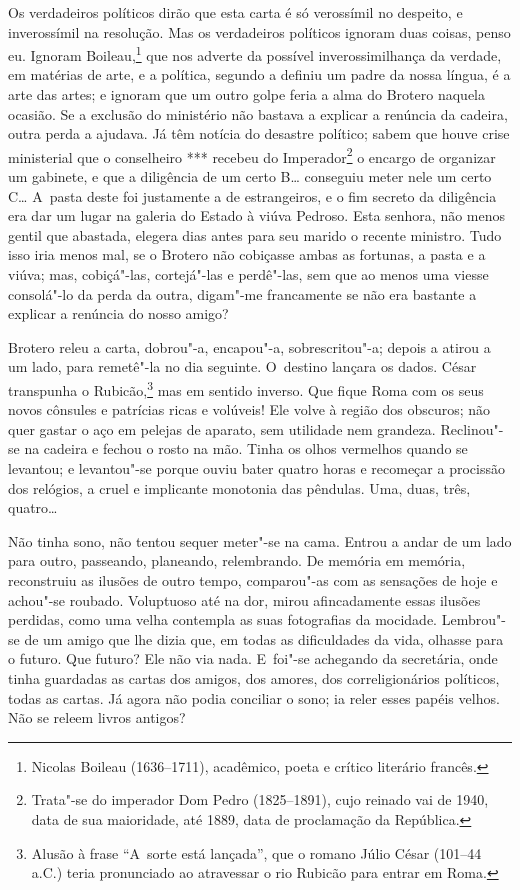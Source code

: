 \begin{linenumbers}
Os verdadeiros políticos dirão que esta carta é só verossímil no
despeito, e inverossímil na resolução. Mas os verdadeiros políticos
ignoram duas coisas, penso eu. Ignoram Boileau,\footnote{Nicolas Boileau
  (1636--1711), acadêmico, poeta e crítico literário francês.} que nos
adverte da possível inverossimilhança da verdade, em matérias de arte, e
a política, segundo a definiu um padre da nossa língua, é a arte das
artes; e ignoram que um outro golpe feria a alma do Brotero naquela
ocasião. Se a exclusão do ministério não bastava a explicar a renúncia
da cadeira, outra perda a ajudava. Já têm notícia do desastre político;
sabem que houve crise ministerial que o conselheiro *** recebeu do
Imperador\footnote{Trata"-se do imperador Dom Pedro  (1825--1891), cujo
  reinado vai de 1940, data de sua maioridade, até 1889, data de
  proclamação da República.} o encargo de organizar um gabinete, e que a
diligência de um certo B\ldots{} conseguiu meter nele um certo C\ldots{} A~pasta
deste foi justamente a de estrangeiros, e o fim secreto da diligência
era dar um lugar na galeria do Estado à viúva Pedroso. Esta senhora, não
menos gentil que abastada, elegera dias antes para seu marido o recente
ministro. Tudo isso iria menos mal, se o Brotero não cobiçasse ambas as
fortunas, a pasta e a viúva; mas, cobiçá"-las, cortejá"-las e perdê"-las,
sem que ao menos uma viesse consolá"-lo da perda da outra, digam"-me
francamente se não era bastante a explicar a renúncia do nosso amigo?

Brotero releu a carta, dobrou"-a, encapou"-a, sobrescritou"-a; depois a
atirou a um lado, para remetê"-la no dia seguinte. O~destino lançara os
dados. César transpunha o Rubicão,\footnote{Alusão à frase ``A~sorte está
  lançada'', que o romano Júlio César (101--44 a.C.) teria pronunciado ao
  atravessar o rio Rubicão para entrar em Roma.} mas em sentido
inverso. Que fique Roma com os seus novos cônsules e patrícias ricas e
volúveis! Ele volve à região dos obscuros; não quer gastar o aço em
pelejas de aparato, sem utilidade nem grandeza. Reclinou"-se na cadeira e
fechou o rosto na mão. Tinha os olhos vermelhos quando se levantou; e
levantou"-se porque ouviu bater quatro horas e recomeçar a procissão dos
relógios, a cruel e implicante monotonia das pêndulas. Uma, duas, três,
quatro\ldots{}

Não tinha sono, não tentou sequer meter"-se na cama. Entrou a andar de um
lado para outro, passeando, planeando, relembrando. De memória em
memória, reconstruiu as ilusões de outro tempo, comparou"-as com as
sensações de hoje e achou"-se roubado. Voluptuoso até na dor, mirou
afincadamente essas ilusões perdidas, como uma velha contempla as suas
fotografias da mocidade. Lembrou"-se de um amigo que lhe dizia que, em
todas as dificuldades da vida, olhasse para o futuro. Que futuro? Ele
não via nada. E~foi"-se achegando da secretária, onde tinha guardadas as
cartas dos amigos, dos amores, dos correligionários políticos, todas as
cartas. Já agora não podia conciliar o sono; ia reler esses papéis
velhos. Não se releem livros antigos?


\end{linenumbers}
